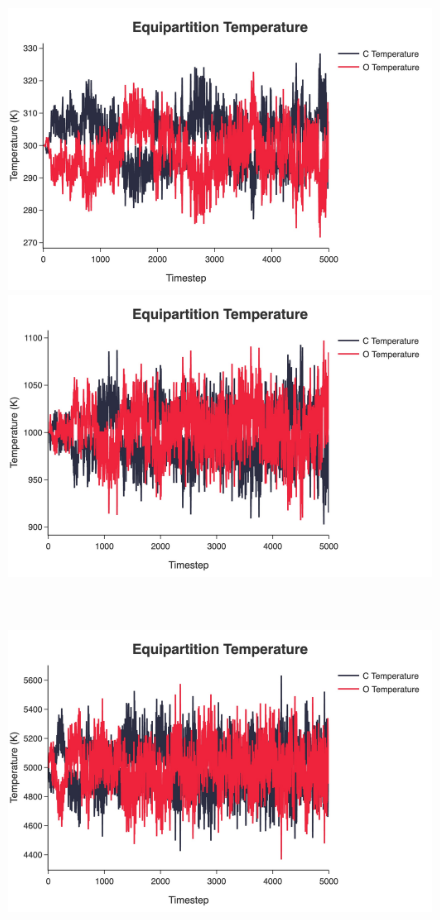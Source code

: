 \documentclass[10pt]{article}
\begin{document}
\begin{figure}[H]
    \centering
    \begin{minipage}{0.43\linewidth}
        \includegraphics[width=\linewidth]{../figures/jpg/temperature/atoms_1000_temp_300_equipartition_temperature.jpg}
    \end{minipage}
    \begin{minipage}{0.43\linewidth}
        \includegraphics[width=\linewidth]{../figures/jpg/temperature/atoms_1000_temp_1000_equipartition_temperature.jpg}
    \end{minipage} \\
    \begin{minipage}{0.43\linewidth}
        \includegraphics[width=\linewidth]{../figures/jpg/temperature/atoms_1000_temp_5000_equipartition_temperature.jpg}

\end{minipage}
\end{figure}
\end{document}
